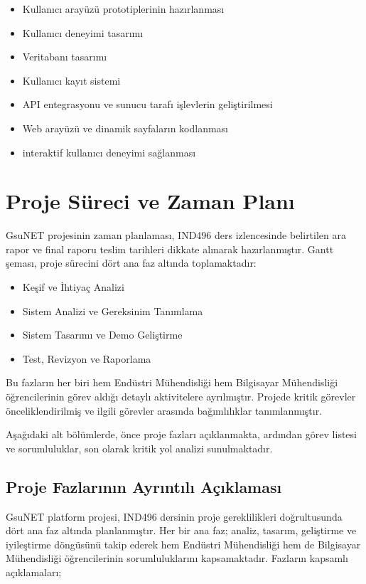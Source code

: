 \documentclass[a4paper,12pt]{report}
\begin{document}
\begin{itemize}
    \item Kullanıcı arayüzü prototiplerinin hazırlanması
    \item Kullanıcı deneyimi tasarımı
    \item Veritabanı tasarımı
    \item Kullanıcı kayıt sistemi
    \item API entegrasyonu ve sunucu tarafı işlevlerin geliştirilmesi
    \item Web arayüzü ve dinamik sayfaların kodlanması
    \item interaktif kullanıcı deneyimi sağlanması
\end{itemize}


\chapter{Proje Süreci ve Zaman Planı}

GsuNET projesinin zaman planlaması, IND496 ders izlencesinde belirtilen ara rapor ve final raporu teslim tarihleri dikkate alınarak hazırlanmıştır. Gantt şeması, proje sürecini dört ana faz altında toplamaktadır:

\begin{itemize}
    \item Keşif ve İhtiyaç Analizi
    \item Sistem Analizi ve Gereksinim Tanımlama
    \item Sistem Tasarımı ve Demo Geliştirme
    \item Test, Revizyon ve Raporlama
\end{itemize}

Bu fazların her biri hem Endüstri Mühendisliği hem Bilgisayar Mühendisliği öğrencilerinin görev aldığı detaylı aktivitelere ayrılmıştır. Projede kritik görevler önceliklendirilmiş ve ilgili görevler arasında bağımlılıklar tanımlanmıştır.

Aşağıdaki alt bölümlerde, önce proje fazları açıklanmakta, ardından görev listesi ve sorumluluklar, son olarak kritik yol analizi sunulmaktadır.

\section{Proje Fazlarının Ayrıntılı Açıklaması}

GsuNET platform projesi, IND496 dersinin proje gereklilikleri doğrultusunda dört ana faz altında planlanmıştır. Her bir ana faz; analiz, tasarım, geliştirme ve iyileştirme döngüsünü takip ederek hem Endüstri Mühendisliği hem de Bilgisayar Mühendisliği öğrencilerinin sorumluluklarını kapsamaktadır. Fazların kapsamlı açıklamaları;
\end{document}
